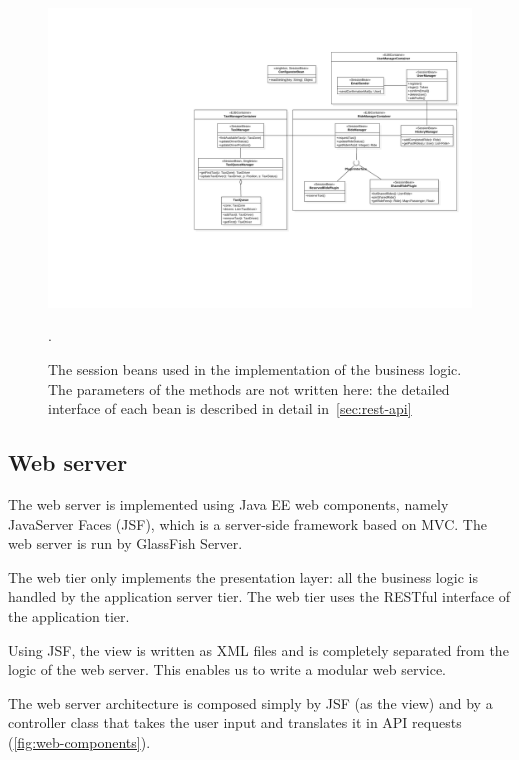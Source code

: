 \begin{figure}
    \centering
    \includegraphics[width=\textwidth]{diagrams/class_sessionbeans}
    \caption{The session beans used in the implementation of the business logic. The parameters of the methods are not written here: the detailed interface of each bean is described in detail in~\autoref{sec:rest-api}}.
    \label{fig:session-beans}
\end{figure}

\subsection{Web server}
\label{sec:comp-view-web-server}
The web server is implemented using Java EE web components, namely JavaServer Faces (JSF), which is a server-side framework based on MVC.
The web server is run by GlassFish Server.

The web tier only implements the presentation layer: all the business logic is handled by the application server tier. The web tier uses the RESTful interface of the application tier.

Using JSF, the view is written as XML files and is completely separated from the logic of the web server. This enables us to write a modular web service.

The web server architecture is composed simply by JSF (as the view) and by a controller class that takes the user input and translates it in API requests (\autoref{fig:web-components}).

